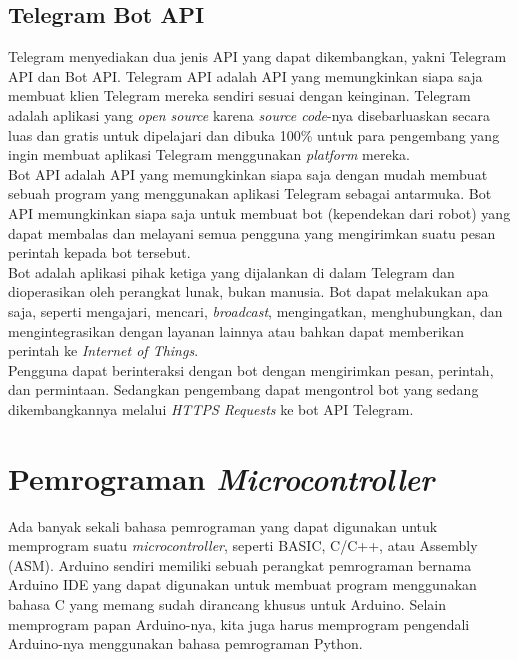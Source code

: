 \subsection{Telegram Bot API}
\tab Telegram menyediakan dua jenis API yang dapat dikembangkan, yakni  Telegram API dan Bot API. Telegram API adalah API yang memungkinkan siapa saja membuat klien Telegram mereka sendiri sesuai dengan keinginan. Telegram adalah aplikasi yang \textit{open source} karena \textit{source code}-nya disebarluaskan secara luas dan gratis untuk dipelajari dan dibuka 100\% untuk para pengembang yang ingin membuat aplikasi Telegram menggunakan \textit{platform} mereka. \\
\tab Bot API adalah API yang memungkinkan siapa saja dengan mudah membuat sebuah program yang menggunakan aplikasi Telegram sebagai antarmuka. Bot API memungkinkan siapa saja untuk membuat bot (kependekan dari robot) yang dapat membalas dan melayani semua pengguna yang mengirimkan suatu pesan perintah kepada bot tersebut. \\
\tab Bot adalah aplikasi pihak ketiga yang dijalankan di dalam Telegram dan dioperasikan oleh perangkat lunak, bukan manusia. Bot dapat melakukan apa saja, seperti mengajari, mencari, \textit{broadcast}, mengingatkan, menghubungkan, dan mengintegrasikan dengan layanan lainnya atau bahkan dapat memberikan perintah ke \textit{Internet of Things}.\\
\tab Pengguna dapat berinteraksi dengan bot dengan mengirimkan pesan, perintah, dan permintaan. Sedangkan pengembang dapat mengontrol bot yang sedang dikembangkannya melalui \textit{HTTPS Requests} ke bot API Telegram.

\section{Pemrograman \textit{Microcontroller}}
\tab Ada banyak sekali bahasa pemrograman yang dapat digunakan untuk memprogram suatu \textit{microcontroller}, seperti BASIC, C/C++, atau Assembly (ASM). Arduino sendiri memiliki sebuah perangkat pemrograman bernama Arduino IDE yang dapat digunakan untuk membuat program menggunakan bahasa C yang memang sudah dirancang khusus untuk Arduino. Selain memprogram papan Arduino-nya, kita juga harus memprogram pengendali Arduino-nya menggunakan bahasa pemrograman Python. 

